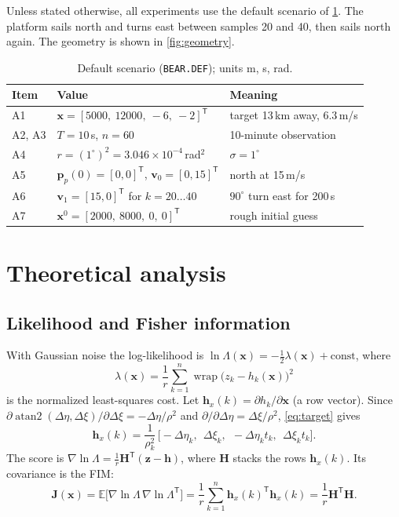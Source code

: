 \documentclass[11pt,a4paper]{article}
\newcommand{\x}{\bm{x}}
\newcommand{\z}{\bm{z}}
\newcommand{\p}{\bm{p}}
\newcommand{\vv}{\bm{v}}
\newcommand{\T}{^{\mathsf{T}}}
\newcommand{\J}{\bm{J}}
\newcommand{\Hm}{\bm{H}}
\newcommand{\E}{\mathbb{E}}
\DeclareMathOperator{\atantwo}{atan2}
\DeclareMathOperator{\wrap}{wrap}
\theoremstyle{plain}
\theoremstyle{remark}
\begin{document}
Unless stated otherwise, all experiments use the default scenario of
\cref{tab:scenario}. The platform sails north and turns east between
samples 20 and 40, then sails north again. The geometry is shown in
\cref{fig:geometry}.

\begin{table}[htbp]
\centering\small
\caption{Default scenario (\texttt{BEAR.DEF}); units m, s, rad.}
\label{tab:scenario}
\begin{tabular}{@{}lll@{}}
\toprule
Item & Value & Meaning\\
\midrule
A1 & $\x = [5000,\ 12000,\ -6,\ -2]\T$ & target 13\,km away, 6.3\,m/s\\
A2, A3 & $T=10$\,s, $n=60$ & 10-minute observation\\
A4 & $r=(1^\circ)^2 = 3.046\times10^{-4}$\,rad$^2$ & $\sigma = 1^\circ$\\
A5 & $\p_p(0)=[0,0]\T$, $\vv_0=[0,15]\T$ & north at 15\,m/s\\
A6 & $\vv_1=[15,0]\T$ for $k=20\ldots40$ & $90^\circ$ turn east for 200\,s\\
A7 & $\x^0=[2000,\ 8000,\ 0,\ 0]\T$ & rough initial guess\\
\bottomrule
\end{tabular}
\end{table}

\section{Theoretical analysis}
\label{sec:theory}

\subsection{Likelihood and Fisher information}

With Gaussian noise the log-likelihood is
$\ln\Lambda(\x) = -\tfrac{1}{2}\lambda(\x) + \text{const}$, where
\begin{equation}
  \lambda(\x) = \frac1r \sum_{k=1}^{n} \wrap\!\big(z_k-h_k(\x)\big)^2
  \label{eq:cost}
\end{equation}
is the normalized least-squares cost. Let $\bm{h}_x(k)=\partial h_k/\partial\x$
(a row vector). Since
$\partial\atantwo(\Delta\eta,\Delta\xi)/\partial\Delta\xi = -\Delta\eta/\rho^2$
and $\partial/\partial\Delta\eta = \Delta\xi/\rho^2$, \cref{eq:target} gives
\begin{equation}
  \bm{h}_x(k) = \frac{1}{\rho_k^2}\,
  \big[-\Delta\eta_k,\ \ \Delta\xi_k,\ \ -\Delta\eta_k t_k,\ \ \Delta\xi_k t_k\big].
  \label{eq:jacobian}
\end{equation}
The score is $\nabla\ln\Lambda = \frac1r\Hm\T(\z-\bm{h})$, where $\Hm$ stacks the
rows $\bm{h}_x(k)$. Its covariance is the FIM:
\begin{equation}
  \J(\x) = \E\big[\nabla\ln\Lambda\,\nabla\ln\Lambda\T\big]
         = \frac{1}{r}\sum_{k=1}^n \bm{h}_x(k)\T \bm{h}_x(k) = \frac1r \Hm\T\Hm .
  \label{eq:fim}
\end{equation}
\end{document}
